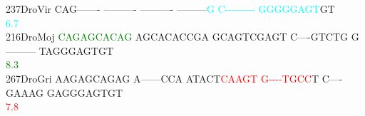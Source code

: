 \documentclass[11pt,twoside,reqno,a4paper]{article}
\begin{document}
{237\hspace*{1\charwidth}DroVir	CAG-------	----------	----------	---------\textcolor{cyan}{G}	\textcolor{cyan}{C}\textcolor{cyan}{-}\textcolor{cyan}{-}\textcolor{cyan}{-}\textcolor{cyan}{-}\textcolor{cyan}{-}\textcolor{cyan}{-}\textcolor{cyan}{-}\textcolor{cyan}{-}\textcolor{cyan}{-}	\textcolor{cyan}{G}\textcolor{cyan}{G}\textcolor{cyan}{G}\textcolor{cyan}{G}\textcolor{cyan}{G}\textcolor{cyan}{A}\textcolor{cyan}{G}\textcolor{cyan}{T}GT	\\
\hspace*{4\charwidth}\hspace*{7\charwidth}\hspace*{1\charwidth}\hspace*{1\charwidth}\hspace*{1\charwidth}\hspace*{39\charwidth}\textcolor{cyan}{6.7}\hspace*{1\charwidth}\hspace*{1\charwidth}\hspace*{1\charwidth}\\
216\hspace*{1\charwidth}DroMoj	\textcolor{green}{C}\textcolor{green}{A}\textcolor{green}{G}\textcolor{green}{A}\textcolor{green}{G}\textcolor{green}{C}\textcolor{green}{A}\textcolor{green}{C}\textcolor{green}{A}\textcolor{green}{G}	AGCACACCGA	GCAGTCGAGT	C----GTCTG	G---------	TAGGGAGTGT	\\
\hspace*{4\charwidth}\hspace*{7\charwidth}\hspace*{0\charwidth}\textcolor{green}{8.3}\hspace*{1\charwidth}\hspace*{1\charwidth}\hspace*{1\charwidth}\hspace*{1\charwidth}\hspace*{1\charwidth}\hspace*{1\charwidth}\\
267\hspace*{1\charwidth}DroGri	AAGAGCAGAG	A------CCA	ATACT\textcolor{red}{C}\textcolor{red}{A}\textcolor{red}{A}\textcolor{red}{G}\textcolor{red}{T}	\textcolor{red}{G}\textcolor{red}{-}\textcolor{red}{-}\textcolor{red}{-}\textcolor{red}{-}\textcolor{red}{T}\textcolor{red}{G}\textcolor{red}{C}\textcolor{red}{C}T	C----GAAAG	GAGGGAGTGT	\\
\hspace*{4\charwidth}\hspace*{7\charwidth}\hspace*{1\charwidth}\hspace*{1\charwidth}\hspace*{25\charwidth}\textcolor{red}{7.8}\hspace*{1\charwidth}\hspace*{1\charwidth}\hspace*{1\charwidth}\hspace*{1\charwidth}\\
}
\end{document}
